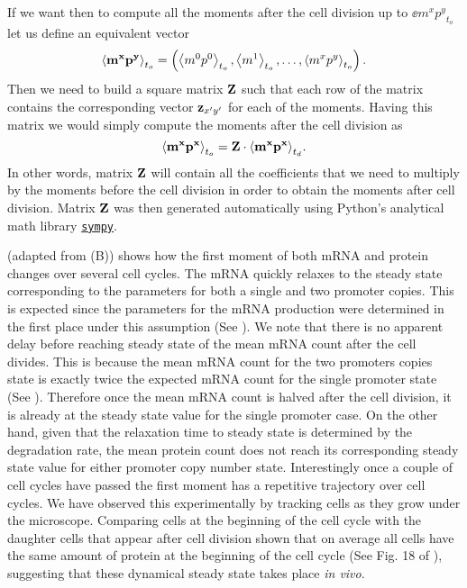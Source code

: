 If we want then to compute all the moments after the cell division up to
$\ee{m^x p^y}_{t_o}$ let us define an equivalent vector
\begin{equation}
\mathbf{\left\langle m^x p^y \right\rangle}_{t_o} = \left(
\left\langle m^0 p^0 \right\rangle_{t_o}, \left\langle m^1 \right\rangle_{t_o}, \ldots , \left\langle m^x p^y \right\rangle_{t_o}
\right).
\end{equation}
Then we need to build a square matrix $\mathbf{Z}$ such that each row of the matrix
contains the corresponding vector $\mathbf{z}_{x' y'}$ for each of the moments.
Having this matrix we would simply compute the moments after the cell division
as
\begin{equation}
\mathbf{\left\langle m^x p^x \right\rangle}_{t_o} = \mathbf{Z} \cdot \mathbf{\left\langle m^x p^x \right\rangle}_{t_d}.
\end{equation}
In other words, matrix $\mathbf{Z}$ will contain all the coefficients that we need
to multiply by the moments before the cell division in order to obtain the
moments after cell division. Matrix $\mathbf{Z}$ was then generated automatically
using Python's analytical math library
\href{https://www.sympy.org/en/index.html}{\texttt{sympy}}.

 (adapted from (B)) shows how
the first moment of both mRNA and protein changes over several cell cycles. The
mRNA quickly relaxes to the steady state corresponding to the parameters for
both a single and two promoter copies. This is expected since the parameters
for the mRNA production were determined in the first place under this
assumption (See ). We note that there is no apparent delay
before reaching steady state of the mean mRNA count after the cell divides.
This is because the mean mRNA count for the two promoters copies  state is
exactly twice the expected mRNA count for the single promoter state (See
). Therefore once the mean mRNA count is halved after the
cell division, it is already at the steady state value for the single promoter
case. On the other hand, given that the relaxation time to steady state is
determined by the degradation rate, the mean protein count does not reach its
corresponding steady state value for either promoter copy number state.
Interestingly once a couple of cell cycles have passed the first moment has a
repetitive trajectory over cell cycles. We have observed this experimentally by
tracking cells as they grow under the microscope. Comparing cells at the
beginning of the cell cycle with the daughter cells that appear after cell
division shown that on average all cells have the same amount of protein at the
beginning of the cell cycle (See Fig. 18 of \cite{Phillips2019}), suggesting
that these dynamical steady state takes place \textit{in vivo}.

